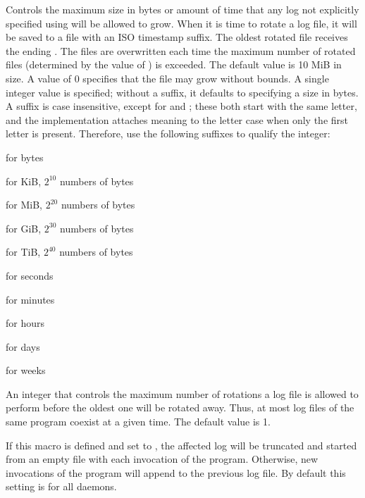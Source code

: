 \begin{description}
\label{param:MaxDefaultLog}
\item[\Macro{MAX\_DEFAULT\_LOG}]
\begin{description} 
  Controls the maximum size in bytes or amount of time that any log
  not explicitly specified using  
  will be allowed to grow.
  When it is time to rotate a log file,
  it will be saved to a file with an ISO timestamp suffix. 
  The oldest rotated file receives the ending . 
  The  files are overwritten each time the maximum 
  number of rotated files (determined by the value of
  ) is exceeded.
  The default value is 10 MiB in size.
  A value of 0 specifies that the file may grow without bounds. 
  A single integer value is specified; without a suffix, it defaults to
  specifying a size in bytes.  A suffix is case insensitive, except for
   and ; these both start with the same letter, and
  the implementation attaches meaning to the letter case when only the first
  letter is present. Therefore, use the following suffixes to
  qualify the integer:
  \item{ for bytes}
  \item{ for KiB, $2^{10}$ numbers of bytes}
  \item{ for MiB, $2^{20}$ numbers of bytes}
  \item{ for GiB, $2^{30}$ numbers of bytes}
  \item{ for TiB, $2^{40}$ numbers of bytes}
  \item{ for seconds}
  \item{ for minutes}
  \item{ for hours}
  \item{ for days}
  \item{ for weeks}
\end{description} 

\label{param:MaxNumSubsysLog}
\item[\Macro{MAX\_NUM\_<SUBSYS>\_LOG}]
  An integer that controls the maximum number of rotations a log file 
  is allowed to perform before the oldest one will be 
  rotated away. Thus, at most 
  log files of the same program coexist at a given time.
  The default value is 1.

\label{param:TruncSubsysLogOnOpen}
\item[\Macro{TRUNC\_<SUBSYS>\_LOG\_ON\_OPEN}]
  If this macro is defined and set
  to , the affected log will be truncated and started from an
  empty file with each invocation of the program.  Otherwise, new
  invocations of the program will append to the previous log
  file.  By default this setting is  for all daemons.
  

\end{description}
